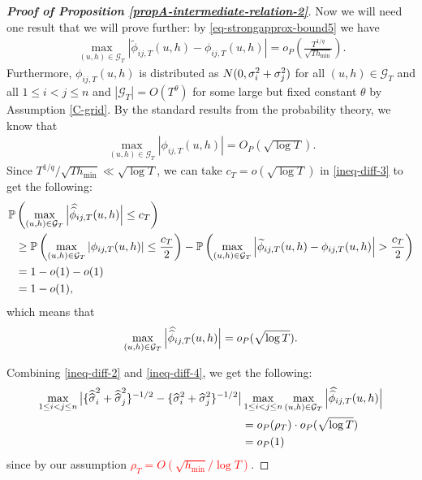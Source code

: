 \documentclass[a4paper,12pt]{article}
\newcommand{\doublehat}[1]{\skew{5.5}\widehat{\widehat{#1}}}
\newcommand{\doublehattwo}[1]{\widehat{\widehat{#1}}}
\begin{document}
\begin{proof}[\textnormal{\textbf{Proof of Proposition \ref{propA-intermediate-relation-2}}}]
Now we will need one result that we will prove further: by \eqref{eq-strongapprox-bound5} we have
\begin{align*}
\max_{(u,h) \in \mathcal{G}_T}\left|\widetilde{\phi}_{ij, T}(u, h) - \phi_{ij, T}(u, h)\right| = o_P\left(\frac{T^{1/q}}{\sqrt{Th_{\min}}}\right).
\end{align*}
Furthermore, $\phi_{ij, T}(u,h)$ is distributed as $ N(0,{\sigma}^2_i + {\sigma}^2_j)$ for all $(u,h) \in \mathcal{G}_T$ and all $1\le i < j \le n$ and $|\mathcal{G}_T| = O(T^\theta)$ for some large but fixed constant $\theta$ by Assumption \ref{C-grid}. By the standard results from the probability theory, we know that
\begin{align*}
\max_{(u,h) \in \mathcal{G}_T}\left|\phi_{ij, T}(u, h)\right| = O_P(\sqrt{\log{T}}).
\end{align*}
Since $T^{1/q}/\sqrt{T h_{\min}} \ll \sqrt{\log T}$, we can take $c_T = o(\sqrt{\log{T}})$ in \eqref{ineq-diff-3} to get the following:
\begin{align*}
\pr&\left(\max_{(u,h) \in \mathcal{G}_T}\Big|\doublehat{\phi}_{ij, T}(u, h)\Big| \leq c_T\right)\\
&\geq \pr \left(\max_{(u,h) \in \mathcal{G}_T}\left|\phi_{ij, T}(u, h)\right| \leq \frac{c_T}{2}\right) - \pr\left(\max_{(u,h) \in \mathcal{G}_T}\left|\widetilde{\phi}_{ij, T}(u, h) - \phi_{ij, T}(u, h)\right| > \frac{c_T}{2} \right)  \\
&= 1 - o(1) - o(1) \\
&= 1 - o(1),
\end{align*}
which means that
\begin{align}\label{ineq-diff-4}
\max_{(u,h) \in \mathcal{G}_T}\Big|\doublehat{\phi}_{ij, T}(u, h)\Big| =o_P(\sqrt{\log{T}}).
\end{align}

Combining \eqref{ineq-diff-2} and \eqref{ineq-diff-4}, we get the following:
\begin{align}\label{ineq-diff-5}
\begin{split}
\max_{1 \le i < j \le n} \big|\{\doublehattwo{\sigma}_i^2 + \doublehattwo{\sigma}_j^2 \}^{-1/2} - \{\widehat{\sigma}_i^2 + \widehat{\sigma}_j^2 \}^{-1/2}\big|&\max_{1 \le i< j \le n} \max_{(u,h) \in \mathcal{G}_T} \Big|\doublehat{\phi}_{ij,T}(u,h)\Big| \\
&= o_P(\rho_T) \cdot o_P(\sqrt{\log{T}}) \\
& = o_P(1)
\end{split}
\end{align}
since by our assumption \textcolor{red}{ $\rho_T = O(\sqrt{h_{\min}}/\log T)$}.


\end{proof}
\end{document}
